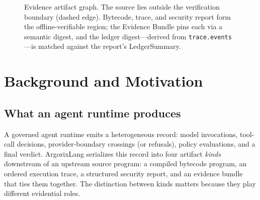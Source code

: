 \documentclass[conference]{IEEEtran}
\newcommand{\code}[1]{\texttt{\small #1}}
\newcommand{\dgst}[1]{\code{#1\_\allowbreak digest}}
\newcommand{\Argorix}{%
\textcolor{argViolet}{A}\textcolor{argViolet}{r}\textcolor{argIndigo}{g}\textcolor{argIndigo}{o}\textcolor{argElectric}{r}\textcolor{argElectric}{i}\textcolor{argElectric}{x}\textcolor{argCyan}{L}\textcolor{argCyan}{a}\textcolor{argCyanBright}{n}\textcolor{argCyanBright}{g}\xspace}
\begin{document}
\begin{figure}[t]
\centering
{}
\caption{Evidence artifact graph. The source lies outside the verification boundary
(dashed edge). Bytecode, trace, and security report form the offline-verifiable region;
the Evidence Bundle pins each via a semantic digest, and the ledger digest---derived from
\code{trace.events}---is matched against the report's LedgerSummary.}
\label{fig:graph}
\end{figure}

\section{Background and Motivation}\label{sec:background}

\subsection{What an agent runtime produces}
A governed agent runtime emits a heterogeneous record: model invocations, tool-call
decisions, provider-boundary crossings (or refusals), policy evaluations, and a final
verdict. \Argorix serializes this record into four artifact \emph{kinds} downstream of an
upstream source program: a compiled bytecode program, an ordered execution trace, a
structured security report, and an evidence bundle that ties them together. The
distinction between kinds matters because they play different evidential roles.
\end{document}
